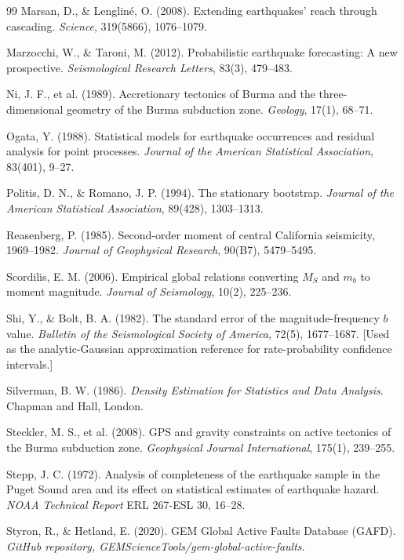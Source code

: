 \documentclass[10pt,a4paper,twocolumn]{article}
\begin{document}
\begin{thebibliography}{99}
 Marsan, D., \& Lenglin\'e, O. (2008). Extending earthquakes' reach through cascading. \emph{Science}, 319(5866), 1076--1079.

 Marzocchi, W., \& Taroni, M. (2012). Probabilistic earthquake forecasting: A new prospective. \emph{Seismological Research Letters}, 83(3), 479--483.

 Ni, J. F., et al. (1989). Accretionary tectonics of Burma and the three-dimensional geometry of the Burma subduction zone. \emph{Geology}, 17(1), 68--71.

 Ogata, Y. (1988). Statistical models for earthquake occurrences and residual analysis for point processes. \emph{Journal of the American Statistical Association}, 83(401), 9--27.

 Politis, D. N., \& Romano, J. P. (1994). The stationary bootstrap. \emph{Journal of the American Statistical Association}, 89(428), 1303--1313.

 Reasenberg, P. (1985). Second-order moment of central California seismicity, 1969--1982. \emph{Journal of Geophysical Research}, 90(B7), 5479--5495.

 Scordilis, E. M. (2006). Empirical global relations converting $M_S$ and $m_b$ to moment magnitude. \emph{Journal of Seismology}, 10(2), 225--236.

 Shi, Y., \& Bolt, B. A. (1982). The standard error of the magnitude-frequency $b$ value. \emph{Bulletin of the Seismological Society of America}, 72(5), 1677--1687. [Used as the analytic-Gaussian approximation reference for rate-probability confidence intervals.]

 Silverman, B. W. (1986). \emph{Density Estimation for Statistics and Data Analysis}. Chapman and Hall, London.

 Steckler, M. S., et al. (2008). GPS and gravity constraints on active tectonics of the Burma subduction zone. \emph{Geophysical Journal International}, 175(1), 239--255.

 Stepp, J. C. (1972). Analysis of completeness of the earthquake sample in the Puget Sound area and its effect on statistical estimates of earthquake hazard. \emph{NOAA Technical Report} ERL 267-ESL 30, 16--28.

 Styron, R., \& Hetland, E. (2020). GEM Global Active Faults Database (GAFD). \emph{GitHub repository, GEMScienceTools/gem-global-active-faults}.


\end{thebibliography}
\end{document}
